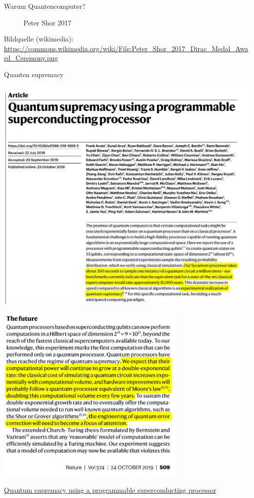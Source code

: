 \documentclass[compress,aspectratio=1610]{beamer}
\begin{document}
\begin{frame}{Warum Quantencomputer?}
\begin{minipage}{0.3\textwidth}
\begin{figure}[h]
      \caption{Peter Shor 2017}
    \end{figure}
  \end{minipage}
  \vfill
  \tiny{Bildquelle (wikimedia): \url{https://commons.wikimedia.org/wiki/File:Peter_Shor_2017_Dirac_Medal_Award_Ceremony.png}}
\end{frame}

\begin{frame}{Quanten supremacy}
  \begin{minipage}{0.45\textwidth}
    \centering
    \includegraphics[width=1.1\textwidth]{figures/Quantum-Supremacy.png}
  \end{minipage}
  \hfill
  \begin{minipage}{0.45\textwidth}
    \centering
    \includegraphics[width=0.7\textwidth]{figures/The-Future.png}
  \end{minipage}
  \vfill
  \tiny{\href{https://www.nature.com/articles/s41586-019-1666-5}{Quantum supremacy using a programmable superconducting processor} \cite{Arute2019}}
\end{frame}    
\end{document}
